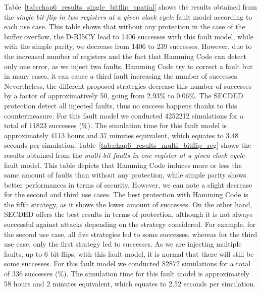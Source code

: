 Table~\ref{tab:chap6_results_single_bitflip_spatial} shows the results obtained from the \textit{single bit-flip in two registers at a given clock cycle} fault model according to each use case. This table shows that without any protection in the case of the buffer overflow, the D-RI5CY lead to 1406 successes with this fault model, while with the simple parity, we decrease from 1406 to 239 successes. However, due to the increased number of registers and the fact that Hamming Code can detect only one error, as we inject two faults, Hamming Code try to correct a fault but in many cases, it can cause a third fault increasing the number of successes. Nevertheless, the different proposed strategies decrease this number of successes by a factor of approximatively 50, going from 2.93\% to 0.06\%. The SECDED protection detect all injected faults, thus no success happens thanks to this countermeasure. For this fault model we conducted \num{4252212} simulations for a total of \num{11823} successes (\%). The simulation time for this fault model is approximately 4113 hours and 37 minutes equivalent, which equates to 3.48 seconds per simulation.
Table~\ref{tab:chap6_results_multi_bitflip_reg} shows the results obtained from the \textit{multi-bit faults in one register at a given clock cycle} fault model. This table depicts that Hamming Code induces more or less the same amount of faults than without any protection, while simple parity shows better performances in terms of security. However, we can note a slight decrease for the second and third use cases. The best protection with Hamming Code is the fifth strategy, as it shows the lower amount of successes. On the other hand, SECDED offers the best results in terms of protection, although it is not always successful against attacks depending on the strategy considered. For example, for the second use case, all five strategies led to some successes, whereas for the third use case, only the first strategy led to successes. As we are injecting multiple faults, up to 6 bit-flips, with this fault model, it is normal that there will still be some successes. For this fault model we conducted \num{82872} simulations for a total of \num{336} successes (\%). The simulation time for this fault model is approximately 58 hours and 2 minutes equivalent, which equates to 2.52 seconds per simulation.
